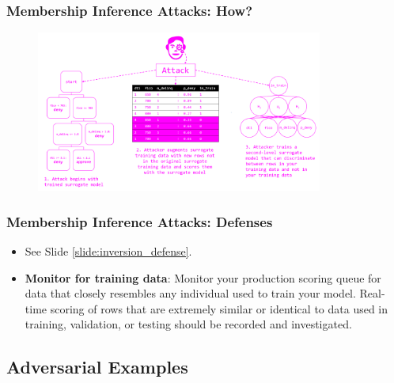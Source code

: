 \documentclass[11pt,
               aspectratio=169,
               hyperref={colorlinks}
               ]{beamer}
\begin{document}
			\begin{frame}[label={slide:membership}]
		
				\frametitle{Membership Inference Attacks: \textbf{How?}}		
			
				\begin{figure}[htb]
					\begin{center}
						\includegraphics[height=150pt]{img/membership.PNG}
					\end{center}
				\end{figure}	

			\end{frame}
			
			\begin{frame}
		
				\frametitle{Membership Inference Attacks: \textbf{Defenses}}		
			
				\begin{itemize}
					\item See Slide \ref{slide:inversion_defense}.
				\item \textbf{Monitor for training data}: Monitor your production scoring queue for data that closely resembles any individual used to train your model. Real-time scoring of rows that are extremely similar or identical to data used in training, validation, or testing should be recorded and investigated.
				\end{itemize}

			\end{frame}
	
		\subsection{Adversarial Examples}
	
\end{document}
